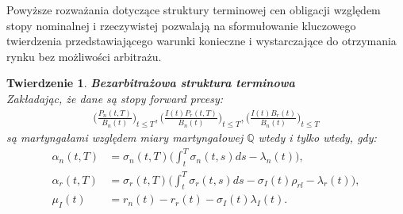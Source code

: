 \documentclass{mini}
\theoremstyle{mythstyle}
\newtheorem{Twierdzenie}{Twierdzenie}[chapter]
\begin{document}
	Powyższe rozważania dotyczące struktury terminowej cen obligacji względem stopy nominalnej i rzeczywistej pozwalają na sformułowanie kluczowego twierdzenia przedstawiającego warunki konieczne i wystarczające do otrzymania rynku bez możliwości arbitrażu.\\
	
	\begin{Twierdzenie} \textbf{Bezarbitrażowa struktura terminowa}\\
		Zakładając, że dane są stopy forward prcesy:
		\begin{eqnarray*}
			\bigg(\frac{P_n(t,T)}{B_n(t)}\bigg)_{t\le T}, \bigg(\frac{I(t)P_r(t,T)}{B_n(t)}\bigg)_{t\le T}, \bigg(\frac{I(t)B_r(t)}{B_n(t)}\bigg)_{t\le T}
		\end{eqnarray*}
		są martyngałami względem miary martyngałowej $\mathbb{Q}$ wtedy i tylko wtedy, gdy:
		\begin{align}
		\alpha_n(t,T) &= \sigma_n(t,T)\bigg(\int_{t}^{T}\sigma_n(t,s)ds-\lambda_n(t)\bigg),\\
		\alpha_r(t,T) &= \sigma_r(t,T)\bigg(\int_{t}^{T}\sigma_r(t,s)ds-\sigma_I(t)\rho_{rl}-\lambda_r(t)\bigg),\\
		\mu_I(t) &= r_n(t)-r_r(t)-\sigma_I(t)\lambda_I(t).
		\end{align}
	\end{Twierdzenie}
	
\end{document}

